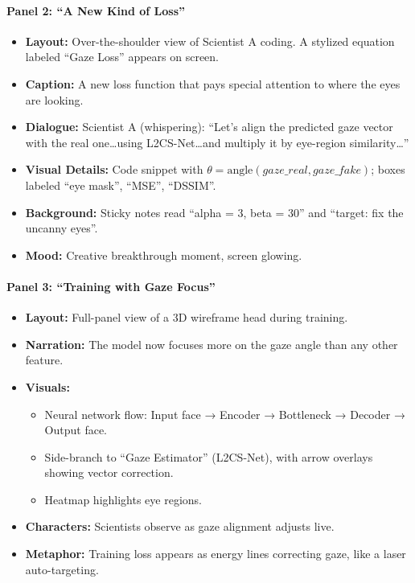 \paragraph{Panel 2: ``A New Kind of Loss''}
\begin{itemize}
    \item \textbf{Layout:} Over-the-shoulder view of Scientist A coding. A stylized equation labeled ``Gaze Loss'' appears on screen.
    \item \textbf{Caption:} A new loss function that pays special attention to where the eyes are looking.
    \item \textbf{Dialogue:} Scientist A (whispering): ``Let's align the predicted gaze vector with the real one\ldots using L2CS-Net\ldots and multiply it by eye-region similarity\ldots''
    \item \textbf{Visual Details:} Code snippet with $\theta = \text{angle}(gaze\_real, gaze\_fake)$; boxes labeled ``eye mask'', ``MSE'', ``DSSIM''.
    \item \textbf{Background:} Sticky notes read ``alpha = 3, beta = 30'' and ``target: fix the uncanny eyes''.
    \item \textbf{Mood:} Creative breakthrough moment, screen glowing.
\end{itemize}

\paragraph{Panel 3: ``Training with Gaze Focus''}
\begin{itemize}
    \item \textbf{Layout:} Full-panel view of a 3D wireframe head during training.
    \item \textbf{Narration:} The model now focuses more on the gaze angle than any other feature.
    \item \textbf{Visuals:}
    \begin{itemize}
        \item Neural network flow: Input face → Encoder → Bottleneck → Decoder → Output face.
        \item Side-branch to ``Gaze Estimator'' (L2CS-Net), with arrow overlays showing vector correction.
        \item Heatmap highlights eye regions.
    \end{itemize}
    \item \textbf{Characters:} Scientists observe as gaze alignment adjusts live.
    \item \textbf{Metaphor:} Training loss appears as energy lines correcting gaze, like a laser auto-targeting.
\end{itemize}

